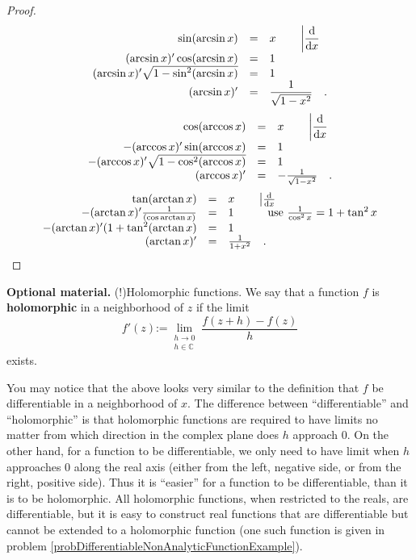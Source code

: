 \documentclass[12pt]{book}
\newcommand{\eqdef}{\textbf{:=}}
\renewcommand{\emph}{\textbf}
\begin{document}
\begin{proof}
\[
\begin{array}{rcl}
\sin(\arcsin x)&=&\displaystyle  x  \quad\quad\left|\frac{{\normalfont \text{d}}}{{\normalfont \text{d}} x}\right. \\
(\arcsin x)'\cos (\arcsin x) &=& 1\\
(\arcsin x)'\sqrt{1-\sin^2(\arcsin x) } &=& 1\\
(\arcsin x)' &=&\displaystyle \frac{1}{\sqrt{1-x^2}}\quad .
\end{array}
\]
\[
\begin{array}{rcl}
\cos(\arccos x)&=&\displaystyle  x \quad\quad\left|\frac{{\normalfont \text{d}}}{{\normalfont \text{d}} x}\right. \\
-(\arccos x)'\sin (\arccos x) &=& 1\\
-(\arccos x)'\sqrt{1-\cos^2(\arccos x) } &=& 1\\
(\arccos x)' &=&-\frac{1}{\sqrt{1-x^2}}\quad .
\end{array}
\]
\[
\begin{array}{rcl}
\tan(\arctan x)&=& x \quad\quad\left|\frac{{\normalfont \text{d}}}{{\normalfont \text{d}} x}\right. \\
-(\arctan x)'\frac{1}{ (\cos{\arctan x})} &=& 1 \quad \quad \quad \mathrm{use~} \frac{1}{\cos^2x}= 1+\tan^2x\\
-(\arctan x)'(1+\tan^2(\arctan x) &=& 1\\
(\arctan x)' &=&\frac{1}{1+x^2}\quad .
\end{array}
\]

\end{proof}


\textbf{Optional material.} (!)Holomorphic functions. We say that a function $f$ is \emph{holomorphic} in a neighborhood of  $z$ if the limit
\[
f'(z)\eqdef \lim_{\substack{h\to 0\\ h\in \mathbb C}} \frac{ f(z+h)-f(z)}{h}
\]
exists.

You may notice that the above looks very similar to the definition that $f$ be differentiable in a neighborhood of $x$. The difference between ``differentiable'' and ``holomorphic'' is that holomorphic functions are required to have limits no matter from which direction in the complex plane does $h$ approach $0$. On the other hand, for a function to be differentiable, we only need to have limit when $h$ approaches $0$ along the real axis (either from the left, negative side, or from the right, positive side). Thus it is ``easier'' for a function to be differentiable, than it is to be holomorphic. All holomorphic functions, when restricted to the reals, are differentiable, but it is easy to construct real functions that are differentiable but cannot be extended to a holomorphic function (one such function is given in problem \ref{probDifferentiableNonAnalyticFunctionExample}).
\end{document}
